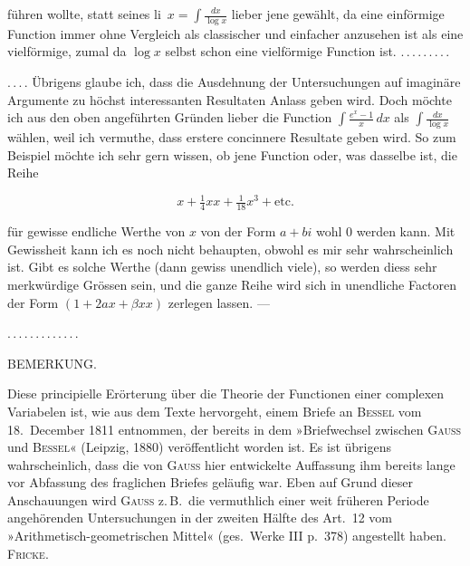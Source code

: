 %
führen wollte, statt seines li~$x = \int \frac{dx}{\log x}$ lieber jene gewählt, da eine
einförmige Function immer ohne Vergleich als classischer und einfacher anzusehen ist als
eine vielförmige, zumal da $\log x$ selbst schon eine vielförmige Function ist. $\mathord{.}\,\mathord{.}\,\mathord{.}\,\mathord{.}\,\mathord{.}\,\mathord{.}\,\mathord{.}\,\mathord{.}\,\mathord{.}$

$\mathord{.}\,\mathord{.}\,\mathord{.}\,\mathord{.}$ Übrigens glaube ich, dass die Ausdehnung der Untersuchungen auf imaginäre
Argumente zu höchst interessanten Resultaten Anlass geben wird. Doch möchte ich aus den
oben angeführten Gründen lieber die Function $\int \frac{e^x-1}{x}\,dx$ als
$\int \frac{dx}{\log x}$ wählen, weil ich vermuthe, dass erstere concinnere Resultate geben
wird. So zum Beispiel möchte ich sehr gern wissen, ob jene Function oder, was dasselbe ist,
die Reihe

\[
x + \tfrac14 xx + \tfrac{1}{18}x^3 + \text{etc.}
\]

\noindent für gewisse endliche Werthe von $x$ von der Form $a+bi$ wohl $0$ werden kann. Mit
Gewissheit kann ich es noch nicht behaupten, obwohl es mir sehr wahrscheinlich ist. Gibt es
solche Werthe (dann gewiss unendlich viele), so werden diess sehr merkwürdige Grössen sein,
und die ganze Reihe wird sich in unendliche Factoren der Form $(1+2ax+\beta xx)$ zerlegen
lassen. ---

$\mathord{.}\,\mathord{.}\,\mathord{.}\,\mathord{.}\,\mathord{.}\,\mathord{.}\,\mathord{.}\,\mathord{.}\,\mathord{.}\,\mathord{.}\,\mathord{.}\,\mathord{.}\,\mathord{.}$

\begin{center}
BEMERKUNG.
\end{center}

\noindent\hspace*{\parindent}Diese principielle Erörterung über die Theorie der Functionen einer complexen Variabelen
ist, wie aus dem Texte hervorgeht, einem Briefe an \textsc{Bessel} vom 18.\ December 1811
entnommen, der bereits in dem »Briefwechsel zwischen \textsc{Gauss} und \textsc{Bessel}«
(Leipzig, 1880) veröffentlicht worden ist. Es ist übrigens wahrscheinlich, dass die von
\textsc{Gauss} hier entwickelte Auffassung ihm bereits lange vor Abfassung des fraglichen
Briefes geläufig war. Eben auf Grund dieser Anschauungen wird \textsc{Gauss} z.\,B.\ die
vermuthlich einer weit früheren Periode angehörenden Untersuchungen in der zweiten Hälfte
des Art.\ 12 vom »Arithmetisch-geometrischen Mittel« (ges.\ Werke III p.\ 378) angestellt
haben. \hfill \textsc{Fricke}.

